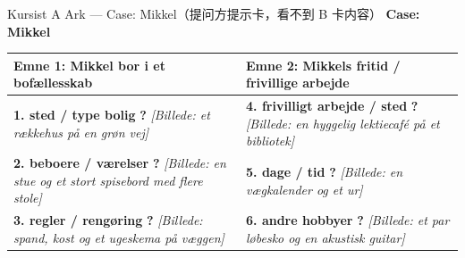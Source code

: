\begin{emailbox}{Kursist A Ark --- Case: Mikkel（提问方提示卡，看不到 B 卡内容）}
\centering
\textbf{\color{NCDNavy}\large Case: Mikkel} 

\vspace{0.4em}
\raggedright
\small
\renewcommand{\arraystretch}{1.35}
\begin{tabularx}{\linewidth}{@{} >{\raggedright\arraybackslash}X @{\hspace{0.5cm}} >{\raggedright\arraybackslash}X @{}}
\toprule
\textbf{\color{NCDNavy}Emne 1: Mikkel bor i et bofællesskab} & \textbf{\color{NCDNavy}Emne 2: Mikkels fritid / frivillige arbejde} \\
\midrule
\textbf{1. sted / type bolig} \hfill \textbf{\color{NCDRed}?}\newline
\textit{[Billede: et rækkehus på en grøn vej]} &
\textbf{4. frivilligt arbejde / sted} \hfill \textbf{\color{NCDRed}?}\newline
\textit{[Billede: en hyggelig lektiecafé på et bibliotek]} \\[4pt]
\midrule
\textbf{2. beboere / værelser} \hfill \textbf{\color{NCDRed}?}\newline
\textit{[Billede: en stue og et stort spisebord med flere stole]} &
\textbf{5. dage / tid} \hfill \textbf{\color{NCDRed}?}\newline
\textit{[Billede: en vægkalender og et ur]} \\[4pt]
\midrule
\textbf{3. regler / rengøring} \hfill \textbf{\color{NCDRed}?}\newline
\textit{[Billede: spand, kost og et ugeskema på væggen]} &
\textbf{6. andre hobbyer} \hfill \textbf{\color{NCDRed}?}\newline
\textit{[Billede: et par løbesko og en akustisk guitar]} \\
\bottomrule
\end{tabularx}
\end{emailbox}

